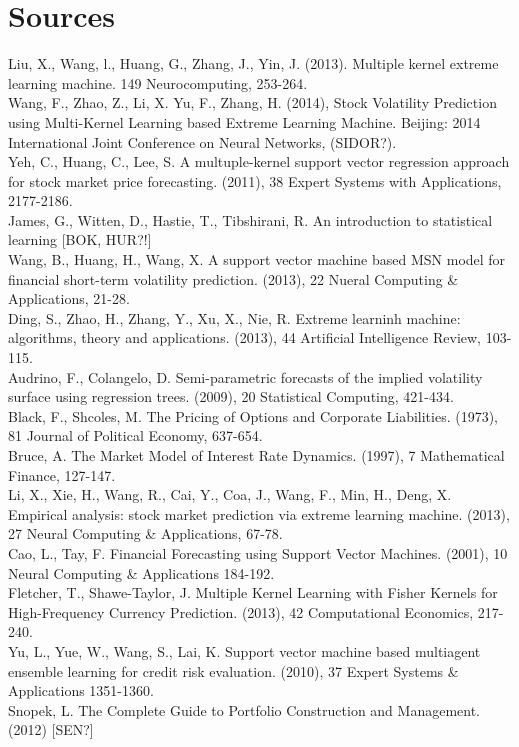 \documentclass{article}
\begin{document}
\newpage
\section{Sources}
Liu, X., Wang, l., Huang, G., Zhang, J., Yin, J. (2013). Multiple kernel extreme learning machine. 149 Neurocomputing, 253-264. \\
Wang, F., Zhao, Z., Li, X. Yu, F., Zhang, H. (2014), Stock Volatility Prediction using Multi-Kernel Learning based Extreme Learning Machine. Beijing: 2014 International Joint Conference on Neural Networks, (SIDOR?). \\
Yeh, C., Huang, C., Lee, S. A multuple-kernel support vector regression approach for stock market price forecasting. (2011), 38 Expert Systems with Applications, 2177-2186. \\
James, G., Witten, D., Hastie, T., Tibshirani, R. An introduction to statistical learning [BOK, HUR?!] \\
Wang, B., Huang, H., Wang, X. A support vector machine based MSN model for financial short-term volatility prediction. (2013), 22 Nueral Computing \& Applications, 21-28. \\
Ding, S., Zhao, H., Zhang, Y., Xu, X., Nie, R. Extreme learninh machine: algorithms, theory and applications. (2013), 44 Artificial Intelligence Review, 103-115. \\
Audrino, F., Colangelo, D. Semi-parametric forecasts of the implied volatility surface using regression trees. (2009), 20 Statistical Computing, 421-434. \\
Black, F., Shcoles, M. The Pricing of Options and Corporate Liabilities. (1973), 81 Journal of Political Economy, 637-654. \\
Bruce, A. The Market Model of Interest Rate Dynamics. (1997), 7 Mathematical Finance, 127-147. \\
Li, X., Xie, H., Wang, R., Cai, Y., Coa, J., Wang, F., Min, H., Deng, X. Empirical analysis: stock market prediction via extreme learning machine. (2013), 27 Neural Computing \& Applications, 67-78. \\
Cao, L., Tay, F. Financial Forecasting using Support Vector Machines. (2001), 10 Neural Computing \& Applications 184-192. \\
Fletcher, T., Shawe-Taylor, J. Multiple Kernel Learning with Fisher Kernels for High-Frequency Currency Prediction. (2013), 42 Computational Economics, 217-240. \\
Yu, L., Yue, W., Wang, S., Lai, K. Support vector machine based multiagent ensemble learning for credit risk evaluation. (2010), 37 Expert Systems \& Applications 1351-1360. \\
Snopek, L. The Complete Guide to Portfolio Construction and Management. (2012) [SEN?] \\
\end{document}
